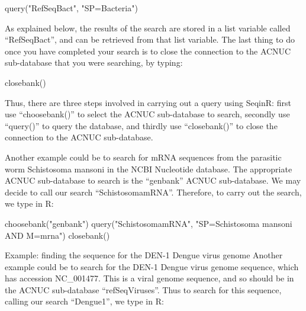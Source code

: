 \documentclass[
]{book}
\newenvironment{Shaded}{\begin{snugshade}}{\end{snugshade}}
\newcommand{\FunctionTok}[1]{\textcolor[rgb]{0.00,0.00,0.00}{#1}}
\newcommand{\NormalTok}[1]{#1}
\newcommand{\StringTok}[1]{\textcolor[rgb]{0.31,0.60,0.02}{#1}}
\begin{document}
\begin{Shaded}
\begin{Highlighting}[]
\FunctionTok{query}\NormalTok{(}\StringTok{"RefSeqBact"}\NormalTok{, }\StringTok{"SP=Bacteria"}\NormalTok{)}
\end{Highlighting}
\end{Shaded}

As explained below, the results of the search are stored in a list variable called ``RefSeqBact'', and can be retrieved from that list variable. The last thing to do once you have completed your search is to close the connection to the ACNUC sub-database that you were searching, by typing:

\begin{Shaded}
\begin{Highlighting}[]
\FunctionTok{closebank}\NormalTok{()}
\end{Highlighting}
\end{Shaded}

Thus, there are three steps involved in carrying out a query using SeqinR: first use ``choosebank()'' to select the ACNUC sub-database to search, secondly use ``query()'' to query the database, and thirdly use ``closebank()'' to close the connection to the ACNUC sub-database.

Another example could be to search for mRNA sequences from the parasitic worm Schistosoma mansoni in the NCBI Nucleotide database. The appropriate ACNUC sub-database to search is the ``genbank'' ACNUC sub-database. We may decide to call our search ``SchistosomamRNA''. Therefore, to carry out the search, we type in R:

\begin{Shaded}
\begin{Highlighting}[]
\FunctionTok{choosebank}\NormalTok{(}\StringTok{"genbank"}\NormalTok{)}
\FunctionTok{query}\NormalTok{(}\StringTok{"SchistosomamRNA"}\NormalTok{, }\StringTok{"SP=Schistosoma mansoni AND M=mrna"}\NormalTok{)}
\FunctionTok{closebank}\NormalTok{()}
\end{Highlighting}
\end{Shaded}

Example: finding the sequence for the DEN-1 Dengue virus genome
Another example could be to search for the DEN-1 Dengue virus genome sequence, which has accession NC\_001477. This is a viral genome sequence, and so should be in the ACNUC sub-database ``refSeqViruses''. Thus to search for this sequence, calling our search ``Dengue1'', we type in R:
\end{document}
